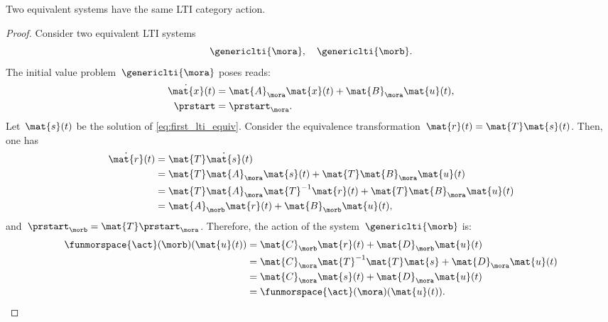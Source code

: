 \begin{lemma}
    \label{lem:equivsystequivact}
    Two equivalent systems have the same LTI category action.
\end{lemma}
\begin{proof}
    Consider two equivalent LTI systems
    \begin{equation*}
        \genericlti{\mora},\quad \genericlti{\morb}.
    \end{equation*}
    The initial value problem~$\genericlti{\mora}$ poses reads:
    \begin{equation}
        \label{eq:first_lti_equiv}
        \begin{aligned}
            \dot{\mat{x}}(t) & =\mat{A}_{\mora}\mat{x}(t)+\mat{B}_{\mora}\mat{u}(t), \\
            \prstart         & = \prstart_\mora.
        \end{aligned}
    \end{equation}
    Let~$\mat{s}(t)$ be the solution of \cref{eq:first_lti_equiv}.
    Consider the equivalence transformation~$\mat{r}(t)=\mat{T}\mat{s}(t)$.
    Then, one has
    \begin{equation*}
        \begin{aligned}
            \dot{\mat{r}}(t) & =\mat{T}\dot{\mat{s}}(t) \\
                             & =\mat{T}\mat{A}_\mora \mat{s}(t)+\mat{T}\mat{B}_\mora \mat{u}(t) \\
                             & =\mat{T}\mat{A}_\mora \mat{T}^{-1}\mat{r}(t)+\mat{T}\mat{B}_\mora \mat{u}(t) \\
                             & =\mat{A}_\morb\mat{r}(t)+\mat{B}_\morb \mat{u}(t),
        \end{aligned}
    \end{equation*}
    and~$ \prstart_\morb=\mat{T} \prstart_\mora$.
    Therefore, the action of the system~$\genericlti{\morb}$ is:
    \begin{equation*}
        \begin{aligned}
            \funmorspace{\act}(\morb)(\mat{u}(t)) & =\mat{C}_\morb \mat{r}(t)+ \mat{D}_\morb \mat{u}(t) \\
                                                  & =\mat{C}_\mora \mat{T}^{-1}\mat{T}\mat{s}+\mat{D}_\mora \mat{u}(t) \\
                                                  & =\mat{C}_\mora \mat{s}(t)+\mat{D}_\mora \mat{u}(t) \\
                                                  & =\funmorspace{\act}(\mora)(\mat{u}(t)).
        \end{aligned}
    \end{equation*}
\end{proof}

